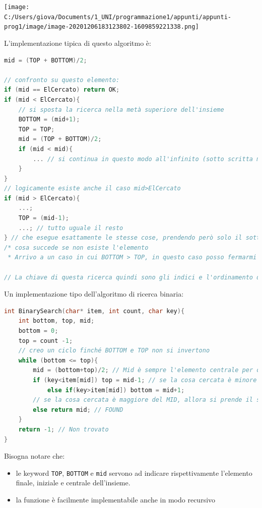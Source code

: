 \documentclass[
  paper=a4,
  oneside  ,captions=tableheading
]{scrbook}
\newcommand{\passthrough}[1]{#1}
\providecommand{\tightlist}{%
  \setlength{\itemsep}{0pt}\setlength{\parskip}{0pt}}
\begin{document}
\texttt{[image: C:/Users/giova/Documents/1\_UNI/programmazione1/appunti/appunti-prog1/image/image-20201206183123802-1609859221338.png]}

L'implementazione tipica di questo algoritmo è:

\begin{lstlisting}[language={C++}]
mid = (TOP + BOTTOM)/2;

// confronto su questo elemento:
if (mid == ElCercato) return OK;
if (mid < ElCercato){
    // si sposta la ricerca nella metà superiore dell'insieme
    BOTTOM = (mid+1);
    TOP = TOP;
    mid = (TOP + BOTTOM)/2;
    if (mid < mid){
        ... // si continua in questo modo all'infinito (sotto scritta meglio questa funzione)
    }
}
// logicamente esiste anche il caso mid>ElCercato 
if (mid > ElCercato){
    ...;
    TOP = (mid-1);
    ...; // tutto uguale il resto
} // che esegue esattamente le stesse cose, prendendo però solo il sottoinsieme superiore.
/* cosa succede se non esiste l'elemento
 * Arrivo a un caso in cui BOTTOM > TOP, in questo caso posso fermarmi perchè viene meno la definizione di BOTTOM e di TOP

// La chiave di questa ricerca quindi sono gli indici e l'ordinamento dell'insieme.
\end{lstlisting}

Un implementazione tipo dell'algoritmo di ricerca binaria:

\begin{lstlisting}[language={C++}]
int BinarySearch(char* item, int count, char key){
    int bottom, top, mid;
    bottom = 0;
    top = count -1;
    // creo un ciclo finché BOTTOM e TOP non si invertono
    while (bottom <= top){
        mid = (bottom+top)/2; // Mid è sempre l'elemento centrale per ogni ciclo
        if (key<item[mid]) top = mid-1; // se la cosa cercata è minore dell'elemento in mezzo, allora si prende il sottoinsieme sotto
            else if(key>item[mid]) bottom = mid+1;
        // se la cosa cercata è maggiore del MID, allora si prende il sottoinsieme superiore
        else return mid; // FOUND
    }
    return -1; // Non trovato
}
\end{lstlisting}

Bisogna notare che:

\begin{itemize}
\tightlist
\item
  le keyword \passthrough{\lstinline!TOP!},
  \passthrough{\lstinline!BOTTOM!} e \passthrough{\lstinline!mid!}
  servono ad indicare rispettivamente l'elemento finale, iniziale e
  centrale dell'insieme.
\item
  la funzione è facilmente implementabile anche in modo recursivo
\end{itemize}
\end{document}
